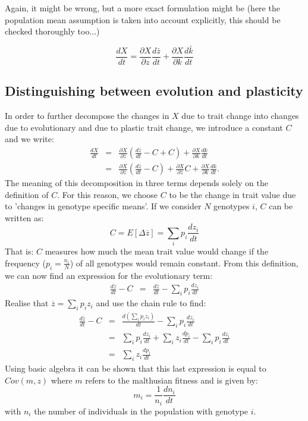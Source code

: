 Again, it might be wrong, but a more exact formulation might be (here the population mean assumption is taken into account explicitly, this should be checked thoroughly too...)

\begin{equation}\label{simHairston3_second}
\frac{dX}{dt} = \frac{\partial X}{\partial z}\frac{d\bar{z}}{dt}+\frac{\partial X}{\partial k}\frac{d\bar{k}}{dt}
\end{equation}

\subsection{Distinguishing between evolution and plasticity}
In order to further decompose the changes in $X$ due to trait change into changes due to evolutionary and due to plastic trait change, we introduce a constant $C$ and we write:
\begin{eqnarray}
\frac{d X}{d t} &=& \frac{\partial X}{\partial \overline{z}}\left(\frac{d\overline{z}}{dt}-C+C\right) + \frac{\partial X}{\partial k}\frac{dk}{dt}\\ &=& \frac{\partial X}{\partial \overline{z}}\left(\frac{d\overline{z}}{dt}-C\right)+\frac{\partial X}{\partial \overline{z}} C + \frac{\partial X}{\partial k}\frac{dk}{dt}. 
\end{eqnarray}
The meaning of this decomposition in three terms depends solely on the definition of $C$. For this reason, we choose $C$ to be the change in trait value due to 'changes in genotype specific means'. If we consider $N$ genotypes $i$, $C$ can be written as:
\begin{equation}
C = E[\Delta \overline{z}] = \sum_i p_i \frac{dz_i}{dt}
\end{equation}
That is: $C$ measures how much the mean trait value would change if the frequency ($p_i = \frac{n_i}{N}$) of all genotypes would remain constant. From this definition, we can now find an expression for the evolutionary term:
\begin{eqnarray}
\frac{d\overline{z}}{dt} - C &=& \frac{d\overline{z}}{dt} - \sum_i p_i \frac{dz_i}{dt}
\end{eqnarray}
Realise that $\overline{z}=\sum_i p_i z_i$ and use the chain rule to find:
\begin{eqnarray}
\frac{d\overline{z}}{dt} - C &=& \frac{d \left(\sum_i p_i z_i\right)}{dt} - \sum_i p_i \frac{dz_i}{dt} \\ &=& \sum_i p_i \frac{dz_i}{dt} + \sum_i z_i \frac{dp_i}{dt} - \sum_i p_i \frac{dz_i}{dt} \\ &=& \sum_i z_i \frac{dp_i}{dt}
\end{eqnarray}
Using basic algebra it can be shown that this last expression is equal to $Cov(m,z)$ where $m$ refers to the malthusian fitness \citep{Crow1970} and is given by: 
\begin{equation}
m_i = \frac{1}{n_i} \frac{dn_i}{dt}
\end{equation}
with $n_i$ the number of individuals in the population with genotype $i$.

